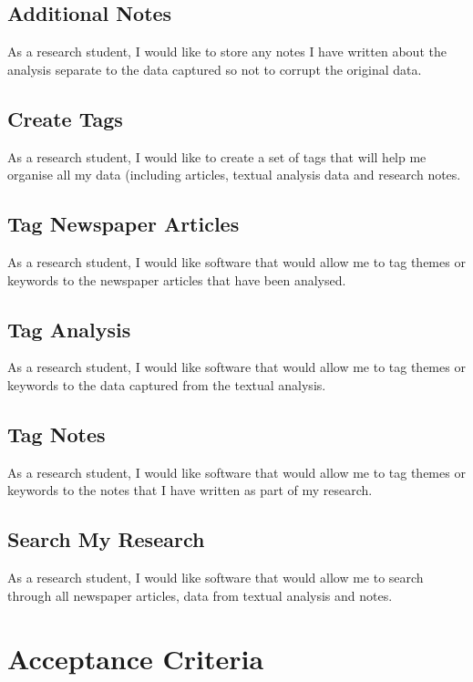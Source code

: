 \documentclass{article}
\begin{document}
\subsection*{Additional Notes}

As a research student, I would like to store any notes I have written about the analysis separate to the data captured so not to corrupt the original data.

\subsection*{Create Tags}

As a research student, I would like to create a set of tags that will help me organise all my data (including articles, textual analysis data and research notes.

\subsection*{Tag Newspaper Articles}

As a research student, I would like software that would allow me to tag themes or keywords to the newspaper articles that have been analysed.

\subsection*{Tag Analysis}

As a research student, I would like software that would allow me to tag themes or keywords to the data captured from the textual analysis.

\subsection*{Tag Notes}

As a research student, I would like software that would allow me to tag themes or keywords to the notes that I have written as part of my research.

\subsection*{Search My Research}

As a research student, I would like software that would allow me to search through all newspaper articles, data from textual analysis and notes.

\section*{Acceptance Criteria}
\end{document}
